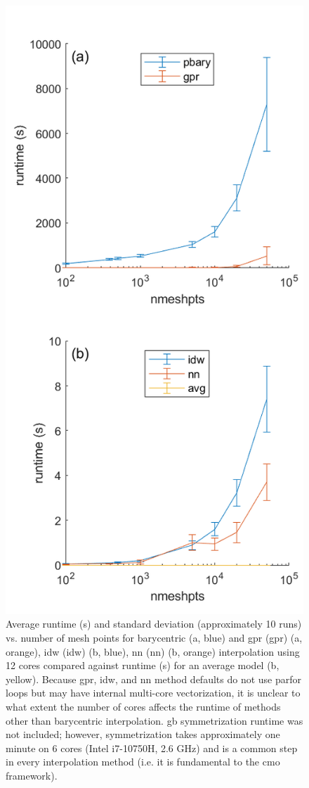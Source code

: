 \documentclass[preprint,12pt]{elsarticle}
\begin{document}
\begin{figure}
    \centering
    \includegraphics{runtime.png}
    \caption{
    Average runtime (s) and standard deviation (approximately 10 runs) vs. number of mesh points for barycentric (a, blue) and \acrlong{gpr} (\acrshort{gpr}) (a, orange), \acrlong{idw} (\acrshort{idw}) (b, blue), \acrlong{nn} (\acrshort{nn}) (b, orange) interpolation using 12 cores compared against runtime (s) for an average model (b, yellow). Because \acrshort{gpr}, \acrshort{idw}, and \acrshort{nn} method defaults do not use parfor loops but may have internal multi-core vectorization, it is unclear to what extent the number of cores affects the runtime of methods other than barycentric interpolation. \Acrlong{gb} symmetrization runtime was not included; however, symmetrization takes approximately one minute on 6 cores (Intel i7-10750H, 2.6 GHz) and is a common step in every interpolation method (i.e. it is fundamental to the \acrlong{cmo} framework).
}
\end{figure}
\end{document}

